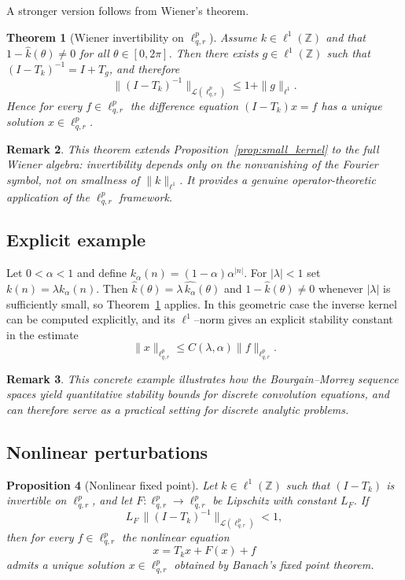 \documentclass[preprint,12pt]{elsarticle}
\newtheorem{theorem}{Theorem}[section]
\newtheorem{proposition}[theorem]{Proposition}
\newtheorem{remark}[theorem]{Remark}
\begin{document}
A stronger version follows from Wiener’s theorem.

\begin{theorem}[Wiener invertibility on $\ell^{p}_{q,r}$]
\label{thm:wiener}
Assume $k\in\ell^1(\mathbb Z)$ and that 
$1-\widehat{k}(\theta)\neq0$ for all $\theta\in[0,2\pi]$.  
Then there exists $g\in\ell^1(\mathbb Z)$ such that 
$(I-T_k)^{-1}=I+T_g$, and therefore
\[
\|(I-T_k)^{-1}\|_{\mathcal L(\ell^{p}_{q,r})}
\le 1+\|g\|_{\ell^1}.
\]
Hence for every $f\in\ell^{p}_{q,r}$ the difference equation 
$(I-T_k)x=f$ has a unique solution $x\in\ell^{p}_{q,r}$.
\end{theorem}

\begin{remark}
This theorem extends Proposition~\ref{prop:small_kernel} to the full Wiener algebra:
invertibility depends only on the nonvanishing of the Fourier symbol, not on 
smallness of $\|k\|_{\ell^1}\!$.  
It provides a genuine operator-theoretic application of the $\ell^{p}_{q,r}$ framework.
\end{remark}

\subsection{Explicit example}

Let $0<\alpha<1$ and define $k_\alpha(n)=(1-\alpha)\alpha^{|n|}$.
For $|\lambda|<1$ set $k(n)=\lambda k_\alpha(n)$.  
Then $\widehat{k}(\theta)=\lambda\,\widehat{k_\alpha}(\theta)$ 
and $1-\widehat{k}(\theta)\neq0$ whenever $|\lambda|$ is sufficiently small,
so Theorem~\ref{thm:wiener} applies.  
In this geometric case the inverse kernel can be computed explicitly, and
its $\ell^1$–norm gives an explicit stability constant in the estimate
\[
\|x\|_{\ell^{p}_{q,r}}\le C(\lambda,\alpha)\|f\|_{\ell^{p}_{q,r}}.
\]

\begin{remark}
This concrete example illustrates how the Bourgain--Morrey sequence spaces 
yield quantitative stability bounds for discrete convolution equations,
and can therefore serve as a practical setting for discrete analytic problems.
\end{remark}

\subsection{Nonlinear perturbations}

\begin{proposition}[Nonlinear fixed point]
Let $k\in\ell^1(\mathbb Z)$ such that $(I-T_k)$ is invertible on $\ell^{p}_{q,r}$,
and let $F:\ell^{p}_{q,r}\to\ell^{p}_{q,r}$ be Lipschitz with constant $L_F$.  
If 
\[
L_F\,\|(I-T_k)^{-1}\|_{\mathcal L(\ell^{p}_{q,r})}<1,
\]
then for every $f\in\ell^{p}_{q,r}$ the nonlinear equation
\[
x = T_kx + F(x) + f
\]
admits a unique solution $x\in\ell^{p}_{q,r}$ obtained by Banach’s fixed point theorem.
\end{proposition}
\end{document}
